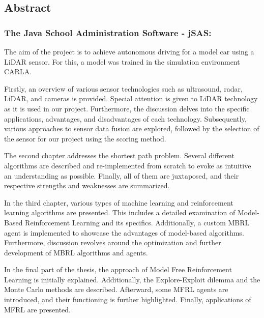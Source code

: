 \begin{flushleft}
	
	\subsection*{Abstract}

	   \subsubsection*{The Java School Administration Software - jSAS:}
	
        	The aim of the project is to achieve autonomous driving for a model car using a LiDAR sensor. For this, a model was trained in the simulation environment CARLA.

            Firstly, an overview of various sensor technologies such as ultrasound, radar, LiDAR, and cameras is provided. Special attention is given to LiDAR technology as it is used in our project. Furthermore, the discussion delves into the specific applications, advantages, and disadvantages of each technology. Subsequently, various approaches to sensor data fusion are explored, followed by the selection of the sensor for our project using the scoring method.

            The second chapter addresses the shortest path problem. Several different algorithms are described and re-implemented from scratch to evoke as intuitive an understanding as possible. Finally, all of them are juxtaposed, and their respective strengths and weaknesses are summarized.
            
            In the third chapter, various types of machine learning and
            reinforcement learning algorithms are presented. This includes a detailed examination of Model-Based Reinforcement Learning and its specifics. Additionally, a custom MBRL agent is implemented to showcase the advantages of model-based algorithms. Furthermore, discussion revolves around the optimization and further development of MBRL algorithms and agents.
            
            In the final part of the thesis, the approach of Model Free Reinforcement Learning is initially explained. Additionally, the Explore-Exploit dilemma and the Monte Carlo methods are described. Afterward, some MFRL agents are introduced, and their functioning is further highlighted. Finally, applications of MFRL are presented.


\end{flushleft}